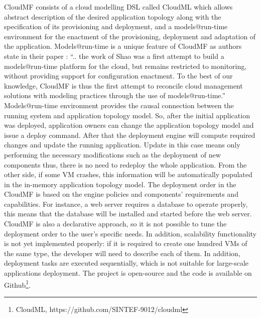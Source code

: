 \noindent CloudMF consists of a cloud modelling DSL called CloudML which allows abstract description of the desired application topology along with the specification of its provisioning and deployment, and a models@run-time environment for the enactment of the provisioning, deployment and adaptation of the application. Models@run-time is a unique feature of CloudMF as authors state in their paper \cite{FerrySongRCS14}: ``.. the work of Shao \cite{ShaoWeiWM10} was a first attempt to build a models@run-time platform for the cloud, but remains restricted to monitoring, without providing support for configuration enactment. To the best of our knowledge, CloudMF is thus the first attempt to reconcile cloud management solutions with modeling practices through the use of models@run-time.'' Models@run-time environment provides the causal connection between the running system and application topology model. So, after the initial application was deployed, application owners can change the application topology model and issue a deploy command. After that the deployment engine will compute required changes and update the running application. Update in this case means only performing the necessary modifications such as the  deployment of new components thus, there is no need to redeploy the whole application. From the other side, if some VM crashes, this information will be automatically populated in the in-memory application topology model. The deployment order in the CloudMF is based on the engine policies and components' requirements and capabilities. For instance, a web server requires a database to operate properly, this means that the database will be installed and started before the web server. CloudMF is also a declarative approach, so it is not possible to tune the deployment order to the user's specific needs. In addition, scalability functionality is not yet implemented properly: if it is required to create one hundred VMs of the same type, the developer will need to describe each of them. In addition, deployment tasks are executed sequentially, which is not suitable for large-scale applications deployment. The project is open-source and the code is available on Github\footnote{ CloudML, https://github.com/SINTEF-9012/cloudml}.

\noindent 

